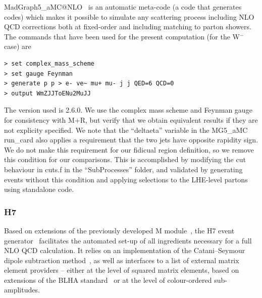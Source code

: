 \documentclass[11pt]{cernrep}
\newcommand{\Herwig}{H\protect\scalebox{0.8}{ERWIG}7\xspace}
\newcommand{\Matchbox}{M\protect\scalebox{0.8}{ATCHBOX}\xspace}
\newcommand{\MoCaNLO}{M\protect\scalebox{0.8}{oCaNLO}\xspace}
\newcommand{\Recola}{R\protect\scalebox{0.8}{ecola}\xspace}
\begin{document}
{\sc MadGraph5\_aMC@NLO}~\cite{Alwall:2014hca} is an automatic meta-code (a code that generates codes) which makes it possible to simulate any scattering process
      including NLO QCD corrections both at fixed-order and including matching to parton showers. 
      The commands that have been used for the present computation (for the W$^{-}$ case) are 
\begin{verbatim}
> set complex_mass_scheme
> set gauge Feynman
> generate p p > e- ve~ mu+ mu- j j QED=6 QCD=0
> output WmZJJToENu2MuJJ
\end{verbatim}
  The version used is 2.6.0. We use the complex mass scheme and Feynman gauge for consistency with \MoCaNLO+\Recola, but 
  verify that we obtain equivalent results if they are not explicity specified.
  We note that the ``deltaeta'' variable in the MG5\_aMC run\_card also applies a requirement that the two jets
  have opposite rapidity sign. We do not make this requirement for our fidicual region definition, so we remove this condition for our comparisons.
  This is accomplished by modifying the cut behaviour in cuts.f in the ``SubProcesses'' folder, and validated by
  generating events without this condition and applying selections to the LHE-level partons using standalone code.
  
\subsubsection*{\protect\Herwig \label{vbs_herwig}}

Based on extensions of the previously developed \Matchbox
module~\cite{Platzer:2011bc}, the \Herwig event generator~\cite{Bellm:2015jjp,Bahr:2008pv} facilitates the automated set-up of all ingredients necessary for a full NLO QCD calculation.
It relies on an implementation of the Catani--Seymour dipole
subtraction method~\cite{Catani:1996vz,Catani:2002hc}, as well as
interfaces to a list of external matrix element providers -- either
at the level of squared matrix elements, based on extensions of the
BLHA standard~\cite{Binoth:2010xt,Alioli:2013nda,Andersen:2014efa} or
at the level of colour-ordered sub-amplitudes.
\end{document}
